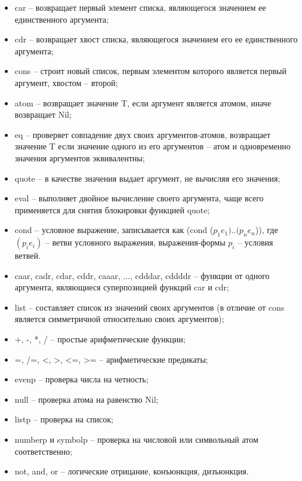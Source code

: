 \documentclass[14pt,a4paper]{scrreprt}
\begin{document}
\begin{itemize}
	\item car -- возвращает первый элемент списка, являющегося значением ее единственного аргумента;
	\item cdr -- возвращает хвост списка, являющегося значением его ее единственного аргумента;
	\item cons --  строит новый список, первым элементом которого является первый аргумент, хвостом -- второй;
	\item atom -- возвращает значение T, если аргумент является атомом, иначе возвращает Nil;
	\item eq -- проверяет совпадение двух своих аргументов-атомов, возвращает значение T если значение одного из его аргументов -- атом и одновременно значения аргументов эквивалентны;
	\item quote -- в качестве значения выдает аргумент, не вычисляя его значения;
	\item eval -- выполняет двойное вычисление своего аргумента, чаще всего применяется для снятия блокировки функцией quote;
	\item cond -- условное выражение, записывается как (cond ($p_1 e_1)..(p_n e_n$)), где $(p_i e_i)$ -- ветви условного выражения, выражения-формы $p_i$ -- условия ветвей.
\end{itemize}



\begin{itemize}
	\item caar, cadr, cdar, cddr, caaar, ..., cdddar, cddddr -- функции от одного аргумента, являющиеся суперпозицией функций car и cdr;
	\item list -- составляет список из значений своих аргументов (в отличие от cons является симметричной относительно своих аргументов);
	\item +, -, *, / -- простые арифметические функции;
	\item =, /=, <, >, <=, >= -- арифметические предикаты;
	\item evenp -- проверка числа на четность;
	\item null -- проверка атома на равенство Nil;
	\item listp -- проверка на список;
	\item numberp и symbolp -- проверка на числовой или символьный атом соответственно;
	\item not, and, or -- логические отрицание, конъюнкция, дизъюнкция.
\end{itemize}
\end{document}
